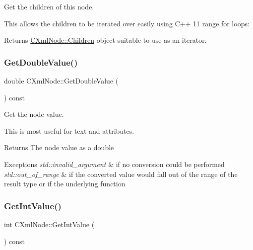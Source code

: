 Get the children of this node. 

This allows the children to be iterated over easily using C++ 11 range for loops\+: 
\begin{DoxyCode}{0}
\DoxyCodeLine{\{}
\DoxyCodeLine{\}}
\end{DoxyCode}
 \begin{DoxyReturn}{Returns}
\mbox{\hyperlink{classxmlnode_1_1_c_xml_node_1_1_children}{C\+Xml\+Node\+::\+Children}} object suitable to use as an iterator. 
\end{DoxyReturn}
\mbox{\label{classxmlnode_1_1_c_xml_node_a8a2b2726257dc82a35fd2f7810c6ccf7}} 
\subsubsection{\texorpdfstring{GetDoubleValue()}{GetDoubleValue()}}
{\footnotesize\ttfamily double C\+Xml\+Node\+::\+Get\+Double\+Value (\begin{DoxyParamCaption}{ }\end{DoxyParamCaption}) const}



Get the node value. 

This is most useful for text and attributes. \begin{DoxyReturn}{Returns}
The node value as a double 
\end{DoxyReturn}

\begin{DoxyExceptions}{Exceptions}
{\em std\+::invalid\+\_\+argument} & if no conversion could be performed \\
\hline
{\em std\+::out\+\_\+of\+\_\+range} & if the converted value would fall out of the range of the result type or if the underlying function \\
\hline
\end{DoxyExceptions}
\mbox{\label{classxmlnode_1_1_c_xml_node_a436c9299f0a8d8ce57d42545cdc4c693}} 
\subsubsection{\texorpdfstring{GetIntValue()}{GetIntValue()}}
{\footnotesize\ttfamily int C\+Xml\+Node\+::\+Get\+Int\+Value (\begin{DoxyParamCaption}{ }\end{DoxyParamCaption}) const}



